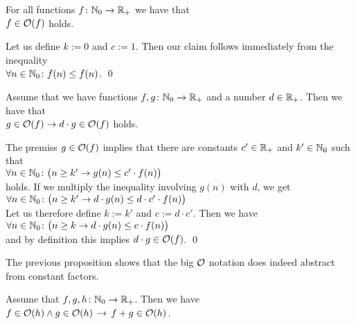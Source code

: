 \begin{Proposition}[Reflexivity]
  For all functions $f\colon {\mathbb N}_0 \rightarrow {{\mathbb R}_+}$ we have that
  \\[0.2cm]
  \hspace*{1.3cm} $f \in \mathcal{O}(f)$ \quad holds. 
\end{Proposition}

\proof
Let us define $k:=0$ and $c:=1$.  Then our claim  follows immediately from the inequality 
\\[0.2cm]
\hspace*{1.3cm}
$\forall n \in {\mathbb N}_0\colon f(n) \leq f(n)$. \qed

\begin{Proposition} \hspace*{\fill} \linebreak
Assume that we have functions  $f,g\colon {\mathbb N}_0 \rightarrow {{\mathbb R}_+}$ and a number $d \in {\mathbb R}_+$.  Then we
have that
\\[0.2cm]
\hspace*{1.3cm}
 $g \in \mathcal{O}(f) \rightarrow d \cdot g \in \mathcal{O}(f)$ \quad holds.
\end{Proposition}

\proof
The premiss $g \in \mathcal{O}(f)$ implies that there are constants $c'\in {\mathbb R}_+$ and $k'\in {\mathbb N}_0$ 
such that \\[0.2cm]
\hspace*{1.3cm} 
$\forall n \in {\mathbb N}_0 \colon \bigl(n \geq k'  \rightarrow g(n) \leq c' \cdot f(n)\bigr)$ 
\\[0.2cm]
holds.  If we multiply the inequality involving $g(n)$ with $d$, we get \\[0.2cm]
\hspace*{1.3cm} 
$\forall n \in {\mathbb N}_0 \colon\bigl( n \geq k'  \rightarrow d \cdot g(n) \leq d \cdot c' \cdot f(n)\bigr)$ 
\\[0.2cm]
Let us therefore define $k:=k'$ and $c := d \cdot c'$.  Then we have \\[0.2cm]
\hspace*{1.3cm}
$\forall n \in {\mathbb N}_0 \colon \bigl(n \geq k  \rightarrow d \cdot g(n) \leq c \cdot f(n)\bigr)$ 
\\[0.2cm]
and by definition this implies $d \cdot g \in \mathcal{O}(f)$. \qed
\vspace*{0.3cm}

\remark 
The previous proposition shows that the big $\mathcal{O}$ notation does indeed abstract
from constant factors.

\begin{Proposition}[Addition]
Assume that $f,g,h \colon {\mathbb N}_0 \rightarrow {{\mathbb R}_+}$. Then we have 
\\[0.2cm]
\hspace*{1.3cm}
$f \in \mathcal{O}(h) \wedge g \in \mathcal{O}(h) \,\rightarrow\, f + g \in \mathcal{O}(h)$.
\end{Proposition}

